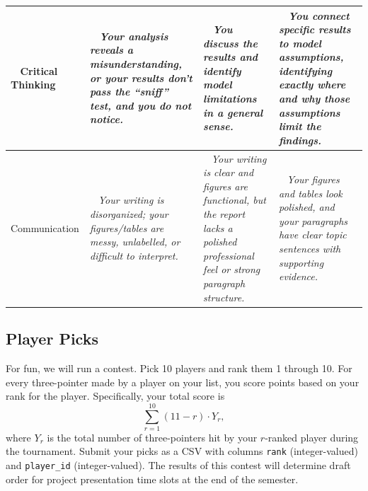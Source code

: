 \documentclass{article}
\begin{document}
\begin{tabular}{|>{\centering\arraybackslash}p{2.5cm}|>{\centering\arraybackslash}p{5cm}|>{\centering\arraybackslash}p{5cm}|>{\centering\arraybackslash}p{5cm}|}
          \hline
          ~ \newline
          Critical \newline Thinking
            \newline ~ & ~ \newline
            \it Your analysis reveals a misunderstanding, or your results don't pass the ``sniff'' test, and you do not notice.
            \newline ~ & ~ \newline
            \it You discuss the results and identify model limitations in a general sense.
            \newline ~ & ~ \newline
            \it You connect specific results to model assumptions, identifying exactly where and why those assumptions limit the findings.
            \newline ~\\
          \hline
          ~ \newline
          Communication
            \newline ~ & ~ \newline
            \it Your writing is disorganized; your figures/tables are messy, unlabelled, or difficult to interpret.
            \newline ~ & ~ \newline
            \it Your writing is clear and figures are functional, but the report lacks a polished professional feel or strong paragraph structure.
            \newline ~ & ~ \newline
            \it Your figures and tables look polished, and your paragraphs have clear topic sentences with supporting evidence.
            \newline ~\\
          \hline
        \end{tabular}
      \vspace{5mm}

    \subsection*{\sc Player Picks}

      For fun, we will run a contest. Pick 10 players and rank them 1 through 10. For every three-pointer made by a player on your list, you score points based on your rank for the player. Specifically, your total score is
      \begin{equation*}
        \sum_{r = 1}^{10} (11 - r) \cdot Y_r,
      \end{equation*}
      where $Y_r$ is the total number of three-pointers hit by your $r$-ranked player during the tournament. Submit your picks as a CSV with columns \texttt{rank} (integer-valued) and \texttt{player\_id} (integer-valued). The results of this contest will determine draft order for project presentation time slots at the end of the semester.
\end{document}
